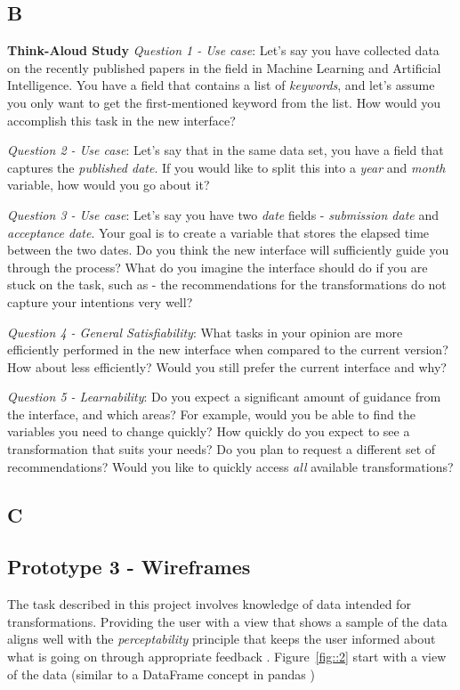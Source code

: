 \documentclass[12pt,letterpaper]{article}
\begin{document}
\subsection*{B}

\textbf{Think-Aloud Study}
\textit{Question 1 - Use case}: Let's say you have collected data on the recently published papers in the field in Machine Learning and Artificial Intelligence. You have a field that contains a list of \textit{keywords}, and let's assume you only want to get the first-mentioned keyword from the list. How would you accomplish this task in the new interface?  

\textit{Question 2 - Use case}: Let's say that in the same data set, you have a field that captures the \textit{published date}. If you would like to split this into a \textit{year} and \textit{month} variable, how would you go about it?

\textit{Question 3 - Use case}: Let's say you have two \textit{date} fields - \textit{submission date} and \textit{acceptance date}. Your goal is to create a variable that stores the elapsed time between the two dates. Do you think the new interface will sufficiently guide you through the process? What do you imagine the interface should do if you are stuck on the task, such as - the recommendations for the transformations do not capture your intentions very well?   

\textit{Question 4 - General Satisfiability}: What tasks in your opinion are more efficiently performed in the new interface when compared to the current version? How about less efficiently? Would you still prefer the current interface and why? 

\textit{Question 5 - Learnability}: Do you expect a significant amount of guidance from the interface, and which areas? For example, would you be able to find the variables you need to change quickly? How quickly do you expect to see a transformation that suits your needs? Do you plan to request a different set of recommendations? Would you like to quickly access \textit{all} available transformations? 

\subsection*{C}

\subsection*{Prototype 3 - Wireframes}
The task described in this project involves knowledge of data intended for transformations. Providing the user with a view that shows a sample of the data aligns well with the \textit{perceptability} principle that keeps the user informed about what is going on through appropriate feedback \cite{nielsen1994usability}. Figure~\ref{fig::2} start with a view of the data (similar to a DataFrame concept in pandas \cite{mckinney2011pandas})
\end{document}
